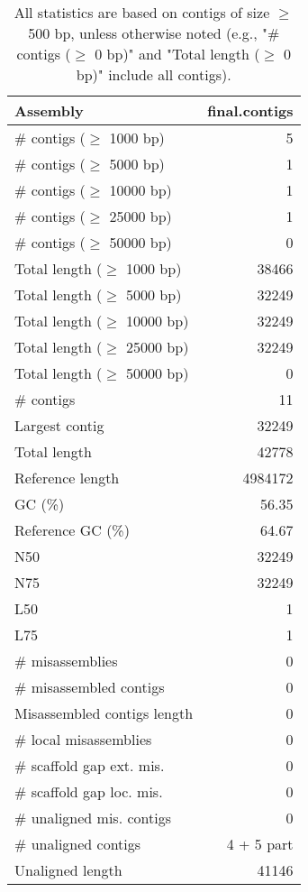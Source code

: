 \documentclass[12pt,a4paper]{article}
\begin{document}
\begin{table}[ht]
\begin{center}
\caption{All statistics are based on contigs of size $\geq$ 500 bp, unless otherwise noted (e.g., "\# contigs ($\geq$ 0 bp)" and "Total length ($\geq$ 0 bp)" include all contigs).}
\begin{tabular}{|l*{1}{|r}|}
\hline
Assembly & final.contigs \\ \hline
\# contigs ($\geq$ 1000 bp) & 5 \\ \hline
\# contigs ($\geq$ 5000 bp) & 1 \\ \hline
\# contigs ($\geq$ 10000 bp) & 1 \\ \hline
\# contigs ($\geq$ 25000 bp) & 1 \\ \hline
\# contigs ($\geq$ 50000 bp) & 0 \\ \hline
Total length ($\geq$ 1000 bp) & 38466 \\ \hline
Total length ($\geq$ 5000 bp) & 32249 \\ \hline
Total length ($\geq$ 10000 bp) & 32249 \\ \hline
Total length ($\geq$ 25000 bp) & 32249 \\ \hline
Total length ($\geq$ 50000 bp) & 0 \\ \hline
\# contigs & 11 \\ \hline
Largest contig & 32249 \\ \hline
Total length & 42778 \\ \hline
Reference length & 4984172 \\ \hline
GC (\%) & 56.35 \\ \hline
Reference GC (\%) & 64.67 \\ \hline
N50 & 32249 \\ \hline
N75 & 32249 \\ \hline
L50 & 1 \\ \hline
L75 & 1 \\ \hline
\# misassemblies & 0 \\ \hline
\# misassembled contigs & 0 \\ \hline
Misassembled contigs length & 0 \\ \hline
\# local misassemblies & 0 \\ \hline
\# scaffold gap ext. mis. & 0 \\ \hline
\# scaffold gap loc. mis. & 0 \\ \hline
\# unaligned mis. contigs & 0 \\ \hline
\# unaligned contigs & 4 + 5 part \\ \hline
Unaligned length & 41146 \\ \hline

\end{tabular}
\end{center}
\end{table}
\end{document}
